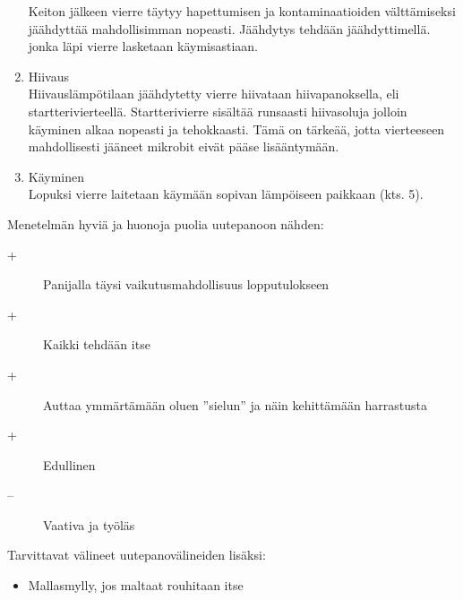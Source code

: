 \documentclass[a4paper,11pt]{report}
\begin{document}
\begin{enumerate}
Keiton jälkeen vierre täytyy hapettumisen ja kontaminaatioiden välttämiseksi jäähdyttää mahdollisimman nopeasti. Jäähdytys tehdään jäähdyttimellä. jonka läpi vierre lasketaan käymisastiaan.
\item Hiivaus \hfill \\
Hiivauslämpötilaan jäähdytetty vierre hiivataan hiivapanoksella, eli startterivierteellä. Startterivierre sisältää runsaasti hiivasoluja jolloin käyminen alkaa nopeasti ja tehokkaasti. Tämä on tärkeää, jotta vierteeseen mahdollisesti jääneet mikrobit eivät pääse lisääntymään.
\item Käyminen \hfill \\
Lopuksi vierre laitetaan käymään sopivan lämpöiseen paikkaan (kts. 5).
\end{enumerate}
Menetelmän hyviä ja huonoja puolia uutepanoon nähden:
\begin{description}
\item[+] Panijalla täysi vaikutusmahdollisuus lopputulokseen
\item[+] Kaikki tehdään itse
\item[+] Auttaa ymmärtämään oluen ''sielun'' ja näin kehittämään harrastusta 
\item[+] Edullinen
\item[--] Vaativa ja työläs
\end{description}
Tarvittavat välineet uutepanovälineiden lisäksi:
\begin{itemize}
\item Mallasmylly, jos maltaat rouhitaan itse
\end{itemize}
\end{document}
